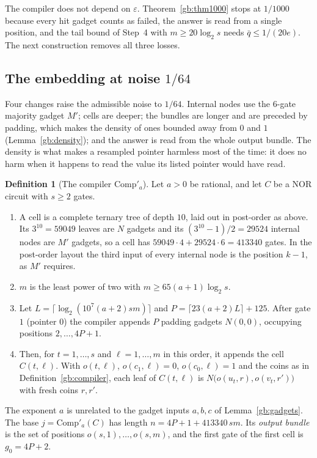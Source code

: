 \documentclass[11pt]{amsart}
\theoremstyle{definition}
\newtheorem{definition}[theorem]{Definition}
\theoremstyle{remark}
\newcommand{\eps}{\varepsilon}
\newcommand{\Comp}{\mathrm{Comp}}
\begin{document}
The compiler does not depend on $\eps$. Theorem~\ref{gb:thm1000} stops at
$1/1000$ because every hit gadget counts as failed, the answer is read from
a single position, and the tail bound of Step~4 with $m\ge20\log_2 s$ needs
$\bar q\le1/(20e)$. The next construction removes all three losses.

\subsection{The embedding at noise \texorpdfstring{$1/64$}{1/64}}
\label{gb:sec-64}

Four changes raise the admissible noise to $1/64$. Internal nodes use the
$6$-gate majority gadget $M'$; cells are deeper; the bundles are longer and
are preceded by padding, which makes the density of ones bounded away from
$0$ and $1$ (Lemma~\ref{gb:density}); and the answer is read from the whole
output bundle. The density is what makes a resampled pointer harmless most
of the time: it does no harm when it happens to read the value its listed
pointer would have read.

\begin{definition}[The compiler $\Comp'_a$]\label{gb:compiler64}
Let $a>0$ be rational, and let $C$ be a NOR circuit with $s\ge2$ gates.
\begin{enumerate}[label=(\roman*)]
\item A cell is a complete ternary tree of depth $10$, laid out in
post-order as above. Its $3^{10}=59049$ leaves are $N$ gadgets and its
$(3^{10}-1)/2=29524$ internal nodes are $M'$ gadgets, so a cell has
$59049\cdot4+29524\cdot6=413340$ gates. In the post-order layout the third
input of every internal node is the position $k-1$, as $M'$ requires.
\item $m$ is the least power of two with $m\ge65(a+1)\log_2 s$.
\item Let $L=\lceil\log_2(10^7(a+2)sm)\rceil$ and
$P=\lceil23(a+2)L\rceil+125$. After gate $1$ (pointer $0$) the compiler
appends $P$ padding gadgets $N(0,0)$, occupying positions $2,\dots,4P+1$.
\item Then, for $t=1,\dots,s$ and $\ell=1,\dots,m$ in this order, it appends
the cell $C(t,\ell)$. With $o(t,\ell)$, $o(c_1,\ell)=0$, $o(c_0,\ell)=1$ and
the coins as in Definition~\ref{gb:compiler}, each leaf of $C(t,\ell)$ is
$N\bigl(o(u_t,r),o(v_t,r')\bigr)$ with fresh coins $r,r'$.
\end{enumerate}
The exponent $a$ is unrelated to the gadget inputs $a,b,c$ of
Lemma~\ref{gb:gadgets}. The base $j=\Comp'_a(C)$ has length $n=4P+1+413340\,sm$. Its \emph{output
bundle} is the set of positions $o(s,1),\dots,o(s,m)$, and the first gate of
the first cell is $g_0=4P+2$.
\end{definition}
\end{document}
